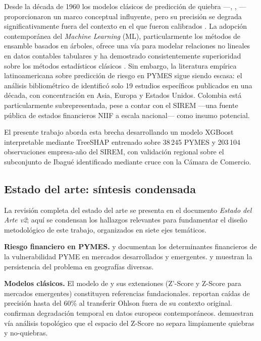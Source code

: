 \documentclass[12pt, letterpaper]{article}
\newcommand{\zaltscore}{Z\textquotesingle\textquotesingle-Score}
\begin{document}
Desde la d\'ecada de 1960 los modelos cl\'asicos de predicci\'on de quiebra ---\citet{Altman1968}, \citet{Ohlson1980}, \citet{Zmijewski1984}--- proporcionaron un marco conceptual influyente, pero su precisi\'on se degrada significativamente fuera del contexto en el que fueron calibrados \citep{Grice2003, Bouwmeester2020, Qiu2020}. La adopci\'on contempor\'anea del \textit{Machine Learning} (ML), particularmente los m\'etodos de ensamble basados en \'arboles, ofrece una v\'ia para modelar relaciones no lineales en datos contables tabulares y ha demostrado consistentemente superioridad sobre los m\'etodos estad\'isticos cl\'asicos \citep{Dasilas2024, ChenGuestrin2016}. Sin embargo, la literatura emp\'irica latinoamericana sobre predicci\'on de riesgo en PYMES sigue siendo escasa: el an\'alisis bibliom\'etrico de \citet{Abubakar2025} identific\'o solo 19 estudios espec\'ificos publicados en una d\'ecada, con concentraci\'on en Asia, Europa y Estados Unidos. Colombia est\'a particularmente subrepresentada, pese a contar con el SIREM ---una fuente p\'ublica de estados financieros NIIF a escala nacional--- como insumo potencial.

El presente trabajo aborda esta brecha desarrollando un modelo XGBoost interpretable mediante TreeSHAP entrenado sobre 38\,245 PYMES y 203\,104 observaciones empresa-a\~no del SIREM, con validaci\'on regional sobre el subconjunto de Ibagu\'e identificado mediante cruce con la C\'amara de Comercio.

\subsection{Estado del arte: s\'intesis condensada}
\label{sec:soa-condensado}

La revisi\'on completa del estado del arte se presenta en el documento \emph{Estado del Arte v2}; aqu\'i se condensan los hallazgos relevantes para fundamentar el dise\~no metodol\'ogico de este trabajo, organizados en siete ejes tem\'aticos.

\textbf{Riesgo financiero en PYMES.} \citet{Cultrera2016} y \citet{Kotaskova2020} documentan los determinantes financieros de la vulnerabilidad PYME en mercados desarrollados y emergentes. \citet{Senaya2025} y \citet{Papadouli2024} muestran la persistencia del problema en geograf\'ias diversas.

\textbf{Modelos cl\'asicos.} El modelo de \citet{Altman1968} y sus extensiones (Z'-Score y \zaltscore{} para mercados emergentes) constituyen referencias fundacionales. \citet{Grice2003} reportan ca\'idas de precisi\'on hasta del 60\% al transferir Ohlson fuera de su contexto original. \citet{Bouwmeester2020} confirman degradaci\'on temporal en datos europeos contempor\'aneos. \citet{Qiu2020} demuestran v\'ia an\'alisis topol\'ogico que el espacio del Z-Score no separa limpiamente quiebras y no-quiebras.
\end{document}
